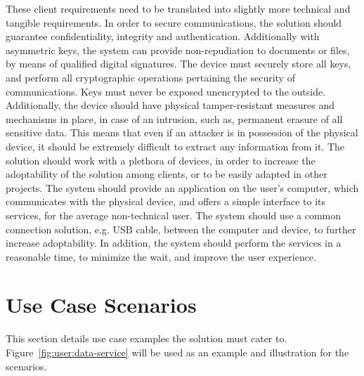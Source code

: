 These client requirements need to be translated into slightly more technical and tangible requirements. In order to secure communications, the solution should guarantee confidentiality, integrity and authentication.
Additionally with asymmetric keys, the system can provide non-repudiation to documents or files, by means of qualified digital signatures.
The device must securely store all keys, and perform all cryptographic operations pertaining the security of communications. Keys must never be exposed unencrypted to the outside.
Additionally, the device should have physical tamper-resistant measures and mechanisms in place, in case of an intrusion, such as, permanent erasure of all sensitive data. 
This means that even if an attacker is in possession of the physical device, it should be extremely difficult to extract any information from it.
The solution should work with a plethora of devices, in order to increase the adoptability of the solution among clients, or to be easily adapted in other projects.
The system should provide an application on the user's computer, which communicates with the physical device, and offers a simple interface to its services, for the average non-technical user.
The system should use a common connection solution, e.g. USB cable, between the computer and device, to further increase adoptability.
In addition, the system should perform the services in a reasonable time, to minimize the wait, and improve the user experience.


\section{Use Case Scenarios}\label{chap:problem:scenarios}

This section details use case examples the solution must cater to. Figure~\ref{fig:user:data-service} will be used as an example and illustration for the scenarios.

